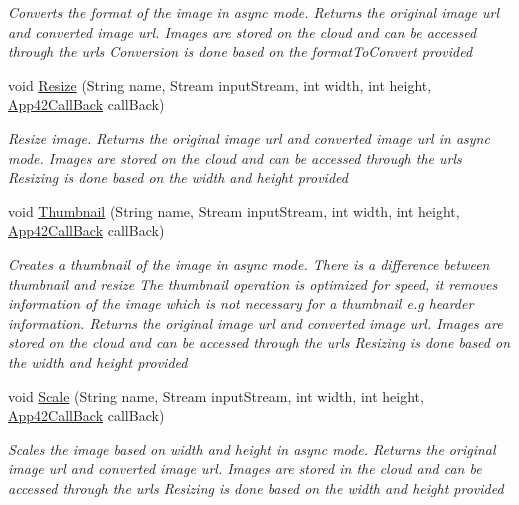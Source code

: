 \begin{DoxyCompactItemize}
\begin{DoxyCompactList}\small\item\em Converts the format of the image in async mode. Returns the original image url and converted image url. Images are stored on the cloud and can be accessed through the urls Conversion is done based on the format\+To\+Convert provided \end{DoxyCompactList}\item 
void \hyperlink{classcom_1_1shephertz_1_1app42_1_1paas_1_1sdk_1_1csharp_1_1image_processor_1_1_image_processor_service_a5ec0ab249393aab825dbe8c69385e4a7}{Resize} (String name, Stream input\+Stream, int width, int height, \hyperlink{interfacecom_1_1shephertz_1_1app42_1_1paas_1_1sdk_1_1csharp_1_1_app42_call_back}{App42\+Call\+Back} call\+Back)
\begin{DoxyCompactList}\small\item\em Resize image. Returns the original image url and converted image url in async mode. Images are stored on the cloud and can be accessed through the urls Resizing is done based on the width and height provided \end{DoxyCompactList}\item 
void \hyperlink{classcom_1_1shephertz_1_1app42_1_1paas_1_1sdk_1_1csharp_1_1image_processor_1_1_image_processor_service_a06337933e51562c2e20cef2db80fda5e}{Thumbnail} (String name, Stream input\+Stream, int width, int height, \hyperlink{interfacecom_1_1shephertz_1_1app42_1_1paas_1_1sdk_1_1csharp_1_1_app42_call_back}{App42\+Call\+Back} call\+Back)
\begin{DoxyCompactList}\small\item\em Creates a thumbnail of the image in async mode. There is a difference between thumbnail and resize The thumbnail operation is optimized for speed, it removes information of the image which is not necessary for a thumbnail e.\+g hearder information. Returns the original image url and converted image url. Images are stored on the cloud and can be accessed through the urls Resizing is done based on the width and height provided \end{DoxyCompactList}\item 
void \hyperlink{classcom_1_1shephertz_1_1app42_1_1paas_1_1sdk_1_1csharp_1_1image_processor_1_1_image_processor_service_a883845f70611c6592531879f7aac1ec7}{Scale} (String name, Stream input\+Stream, int width, int height, \hyperlink{interfacecom_1_1shephertz_1_1app42_1_1paas_1_1sdk_1_1csharp_1_1_app42_call_back}{App42\+Call\+Back} call\+Back)
\begin{DoxyCompactList}\small\item\em Scales the image based on width and height in async mode. Returns the original image url and converted image url. Images are stored in the cloud and can be accessed through the urls Resizing is done based on the width and height provided \end{DoxyCompactList}\item 

\end{DoxyCompactItemize}
